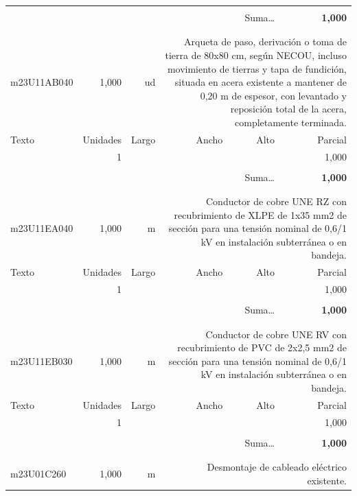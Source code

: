 \documentclass{book}%
\begin{document}
\begin{longtable}{lrrrrr}
&&&&&\\%
\multicolumn{5}{r}{Suma\ldots}&\textbf{     1,000}\\%
\hline%
&&&&&\\%
&&&&&\\%
m23U11AB040&     1,000& ud&\multicolumn{3}{p{6cm}}{\scriptsize Arqueta de paso, derivación o toma de tierra de 80x80 cm, según NECOU, incluso movimiento de tierras y tapa de fundición, situada en acera existente a mantener de 0,20 m de espesor, con levantado y reposición total de la acera, completamente terminada.\normalsize}\\%
Texto&Unidades&Largo&Ancho&Alto&Parcial\\%
\hline%
\multicolumn{1}{p{3.5cm}}{ }&1&&&&     1,000\\%
&&&&&\\%
\multicolumn{5}{r}{Suma\ldots}&\textbf{     1,000}\\%
\hline%
&&&&&\\%
&&&&&\\%
m23U11EA040&     1,000& m&\multicolumn{3}{p{6cm}}{\scriptsize Conductor de cobre UNE RZ con recubrimiento de XLPE de 1x35 mm2 de sección para una tensión nominal de 0,6/1 kV en instalación subterránea o en bandeja.\normalsize}\\%
Texto&Unidades&Largo&Ancho&Alto&Parcial\\%
\hline%
\multicolumn{1}{p{3.5cm}}{ }&1&&&&     1,000\\%
&&&&&\\%
\multicolumn{5}{r}{Suma\ldots}&\textbf{     1,000}\\%
\hline%
&&&&&\\%
&&&&&\\%
m23U11EB030&     1,000& m&\multicolumn{3}{p{6cm}}{\scriptsize Conductor de cobre UNE RV con recubrimiento de PVC de 2x2,5 mm2 de sección para una tensión nominal de 0,6/1 kV en instalación subterránea o en bandeja.\normalsize}\\%
Texto&Unidades&Largo&Ancho&Alto&Parcial\\%
\hline%
\multicolumn{1}{p{3.5cm}}{ }&1&&&&     1,000\\%
&&&&&\\%
\multicolumn{5}{r}{Suma\ldots}&\textbf{     1,000}\\%
\hline%
&&&&&\\%
&&&&&\\%
m23U01C260&     1,000& m&\multicolumn{3}{p{6cm}}{\scriptsize Desmontaje de cableado eléctrico existente.\normalsize}\\%

\end{longtable}
\end{document}
